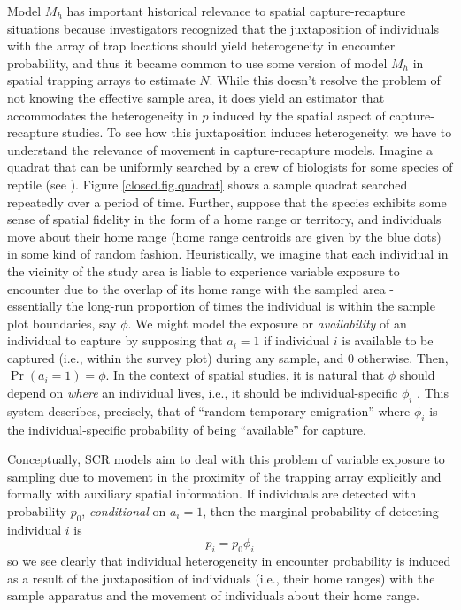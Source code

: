 Model $M_{h}$ has important historical relevance to spatial
capture-recapture situations \citep{karanth:1995} because
investigators recognized that the juxtaposition of individuals with
the array of trap locations should yield heterogeneity in encounter
probability, and thus it became common to use some version of model
$M_h$ in spatial trapping arrays to estimate $N$.  While this doesn't
resolve the problem of not knowing the effective sample area, 
it does yield an estimator that accommodates the heterogeneity in $p$
induced by the spatial aspect of capture-recapture studies.
To see how this juxtaposition induces heterogeneity, we have to
understand the relevance of movement in capture-recapture models.
Imagine a quadrat that can be uniformly searched by a crew of
biologists for some species of reptile (see \citet{royle_young:2008}).
Figure \ref{closed.fig.quadrat} shows a sample quadrat searched
repeatedly over a period of time. Further, suppose that the species
exhibits some sense of spatial fidelity in the form of a home range or
territory, and individuals move about their home range (home range
centroids are given by the blue dots) in some kind of random fashion.
Heuristically, we imagine that each individual in
the vicinity of the study area is liable to experience variable
exposure to encounter due to the overlap of its home range with the
sampled area - essentially the long-run proportion of times the
individual is within the sample plot boundaries, say $\phi$. We
might model the exposure or {\it availability} of an individual to 
capture by supposing that
$a_{i} = 1$ if individual $i$ is available to be captured (i.e.,
within the survey plot) during any sample, and $0$ otherwise. Then,
$\Pr(a_{i}=1) = \phi$.  In the context of spatial studies, it is
natural that $\phi$ should depend on {\it where} an individual lives,
i.e., it should be individual-specific $\phi_{i}$
\citep{chandler_etal:2011}. This system describes, precisely, that of
``random temporary emigration'' \citep{kendall_etal:1997} where $\phi_{i}$
is the individual-specific probability of being ``available'' for
capture.

Conceptually, SCR models aim to deal with
this problem of variable exposure to sampling due to movement in the
proximity of the trapping array explicitly and formally with auxiliary
spatial information.  If individuals are detected with probability
$p_{0}$, {\it conditional} on $a_{i} = 1$, then the marginal
probability of detecting  individual $i$ is
\[
 p_{i} = p_{0}\phi_{i}
\]
so we see clearly that individual heterogeneity in encounter
probability is induced as a result of the juxtaposition of individuals
(i.e., their home ranges) with the sample apparatus and the movement
of individuals about their home range.

